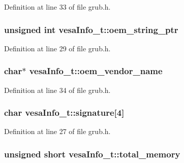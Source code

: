 Definition at line 33 of file grub.\+h.

\hypertarget{structvesaInfo__t_aee5b0eb81a986dc3adadc287dd6809c4}{
\subsubsection[{oem\+\_\+string\+\_\+ptr}]{\setlength{\rightskip}{0pt plus 5cm}unsigned int vesa\+Info\+\_\+t\+::oem\+\_\+string\+\_\+ptr}}\label{structvesaInfo__t_aee5b0eb81a986dc3adadc287dd6809c4}


Definition at line 29 of file grub.\+h.

\hypertarget{structvesaInfo__t_a35b0e91dc1f97ab1f05b8c9a6fe8988f}{
\subsubsection[{oem\+\_\+vendor\+\_\+name}]{\setlength{\rightskip}{0pt plus 5cm}char$\ast$ vesa\+Info\+\_\+t\+::oem\+\_\+vendor\+\_\+name}}\label{structvesaInfo__t_a35b0e91dc1f97ab1f05b8c9a6fe8988f}


Definition at line 34 of file grub.\+h.

\hypertarget{structvesaInfo__t_a48deedd69aeb2ce0d1c27e77f9da23c5}{
\subsubsection[{signature}]{\setlength{\rightskip}{0pt plus 5cm}char vesa\+Info\+\_\+t\+::signature\mbox{[}4\mbox{]}}}\label{structvesaInfo__t_a48deedd69aeb2ce0d1c27e77f9da23c5}


Definition at line 27 of file grub.\+h.

\hypertarget{structvesaInfo__t_ab94cc102e07cdfbf3cb53690bf205321}{
\subsubsection[{total\+\_\+memory}]{\setlength{\rightskip}{0pt plus 5cm}unsigned short vesa\+Info\+\_\+t\+::total\+\_\+memory}}\label{structvesaInfo__t_ab94cc102e07cdfbf3cb53690bf205321}



